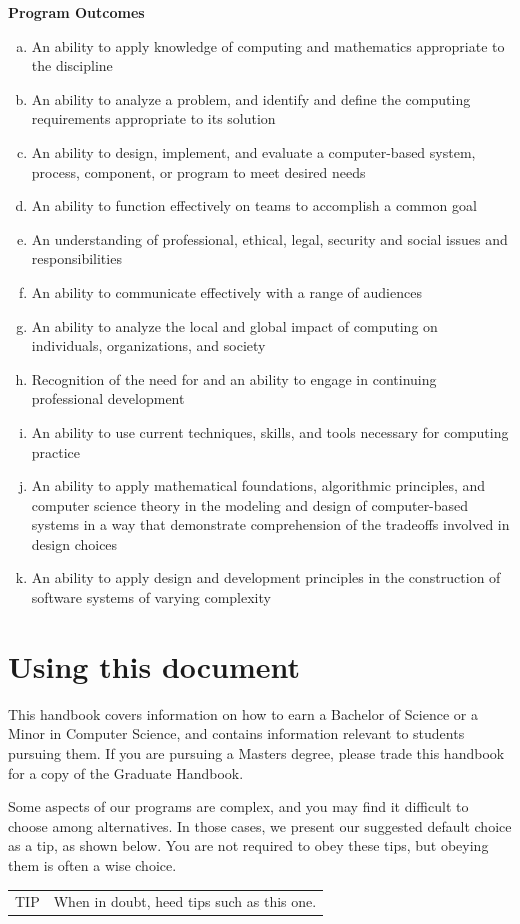 \documentclass{book}
\newenvironment{tip}
    {\tcolorbox \begin{tabular}{p{2cm} l} \Large{TIP} & }
    {\end{tabular} \endtcolorbox}
\begin{document}
\textbf{Program Outcomes} 
\begin{enumerate}[(a)]
\item An ability to apply knowledge of computing and mathematics appropriate to the discipline
\item An ability to analyze a problem, and identify and define the computing requirements appropriate to its solution
\item An ability to design, implement, and evaluate a computer-based system, process, component, or program to meet desired needs
\item An ability to function effectively on teams to accomplish a common goal
\item An understanding of professional, ethical, legal, security and social issues and responsibilities
\item An ability to communicate effectively with a range of audiences
\item An ability to analyze the local and global impact of computing on individuals, organizations, and society
\item Recognition of the need for and an ability to engage in continuing professional development
\item An ability to use current techniques, skills, and tools necessary for computing practice
\item An ability to apply mathematical foundations, algorithmic principles, and computer science theory in the modeling and design of computer-based systems in a way that demonstrate comprehension of the tradeoffs involved in design choices
\item An ability to apply design and development principles in the construction of software systems of varying complexity
\end{enumerate}

\section{Using this document}

This handbook covers information on how to earn a Bachelor of Science or a Minor in Computer Science, and contains information relevant to students pursuing them. If you are pursuing a Masters degree, please trade this handbook for a copy of the Graduate Handbook.

Some aspects of our programs are complex, and you may find it difficult to choose among alternatives. In those cases, we present our suggested default choice as a tip, as shown below. You are not required to obey these tips, but obeying them is often a wise choice.
\begin{tip} \index{tips}
When in doubt, heed tips such as this one.
\end{tip}
\end{document}
